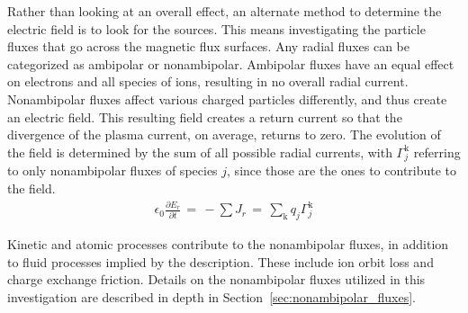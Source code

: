 Rather than looking at an overall effect, an alternate method to determine the electric field is to look for the sources.
This means investigating the particle fluxes that go across the magnetic flux surfaces.
Any radial fluxes can be categorized as ambipolar or nonambipolar.
Ambipolar fluxes have an equal effect on electrons and all species of ions, resulting in no overall radial current.
Nonambipolar fluxes affect various charged particles differently, and thus create an electric field.
This resulting field creates a return current so that the divergence of the plasma current, on average, returns to zero.
The evolution of the field is determined by the sum of all possible radial currents, with $\Gamma_j^\text{k}$ referring to only nonambipolar fluxes of species $j$, since those are the ones to contribute to the field.
\begin{align} %
	\epsilon_0 \frac{\partial E_r}{\partial t} \,=\, -\sum J_r \,=\,
		\sum_\text{k} q_j\Gamma_j^\text{k} \label{eq:ambipolarity_constraint}
\end{align}

Kinetic and atomic processes contribute to the nonambipolar fluxes, in addition to fluid processes implied by the description.
These include ion orbit loss and charge exchange friction.
Details on the nonambipolar fluxes utilized in this investigation are described in depth in Section~\ref{sec:nonambipolar_fluxes}.

